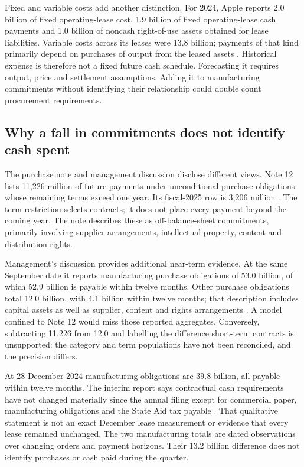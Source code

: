 Fixed and variable costs add another distinction. For 2024, Apple reports
2.0 billion of fixed operating-lease cost, 1.9 billion of fixed operating-lease
cash payments and 1.0 billion of noncash right-of-use assets obtained for lease
liabilities. Variable costs across its leases were 13.8 billion; payments of
that kind primarily depend on purchases of output from the leased assets
\citep[Note 8, printed p.~42]{apple2024}. Historical expense is therefore not a
fixed future cash schedule. Forecasting it requires output, price and settlement
assumptions. Adding it to manufacturing commitments without identifying their
relationship could double count procurement requirements.

\subsection{Why a fall in commitments does not identify cash spent}

The purchase note and management discussion disclose different views. Note 12
lists 11,226 million of future payments under unconditional purchase obligations
whose remaining terms exceed one year. Its fiscal-2025 row is 3,206 million
\citep[Note 12, printed p.~45]{apple2024}. The term restriction selects
contracts; it does not place every payment beyond the coming year. The note
describes these as off-balance-sheet commitments, primarily involving supplier
arrangements, intellectual property, content and distribution rights.

Management's discussion provides additional near-term evidence. At the same
September date it reports manufacturing purchase obligations of 53.0 billion,
of which 52.9 billion is payable within twelve months. Other purchase
obligations total 12.0 billion, with 4.1 billion within twelve months; that
description includes capital assets as well as supplier, content and rights
arrangements \citep[printed p.~25]{apple2024}. A model confined to Note 12
would miss those reported aggregates. Conversely, subtracting 11.226 from 12.0
and labelling the difference short-term contracts is unsupported: the category
and term populations have not been reconciled, and the precision differs.

At 28 December 2024 manufacturing obligations are 39.8 billion, all payable
within twelve months. The interim report says contractual cash requirements
have not changed materially since the annual filing except for commercial
paper, manufacturing obligations and the State Aid tax payable
\citep[printed p.~16]{apple2025q1}. That qualitative statement is not an exact
December lease measurement or evidence that every lease remained unchanged.
The two manufacturing totals are dated observations over changing orders and
payment horizons. Their 13.2 billion difference does not identify purchases
or cash paid during the quarter.

